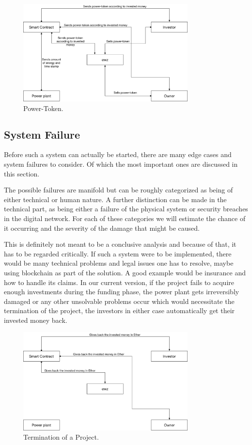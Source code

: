
\begin{figure}[h]
\centering
\includegraphics[width=0.8\textwidth]{images/IMG_0231.JPG}
\caption{\label{fig:Power-Token}Power-Token.}
\end{figure}
\newpage
\subsection{System Failure}
Before such a system can actually be started, there are many edge cases and system failures to consider. Of which the most important ones are discussed in this section.

The possible failures are manifold but can be roughly categorized as being of either technical or human nature. A further distinction can be made in the technical part, as being either a failure of the physical system or security breaches in the digital network. For each of these 
categories we will estimate the chance of it occurring and the severity of the damage that might be caused.

This is definitely not meant to be a conclusive analysis and because of that, it has to be regarded critically. If such a system were to be implemented, there would be many technical problems and legal issues one has to resolve, maybe using blockchain as part of the solution. A good example would be insurance and how to handle its claims. In our current version, if the project fails to acquire enough investments during the funding phase, the power plant gets irreversibly damaged or any other unsolvable problems occur which would necessitate the termination of the project, the investors in either case automatically get their invested money back.

\begin{figure}[h]
\centering
\includegraphics[width=0.8\textwidth]{images/IMG_0230.JPG}
\caption{\label{fig:terminate}Termination of a Project.}
\end{figure}

